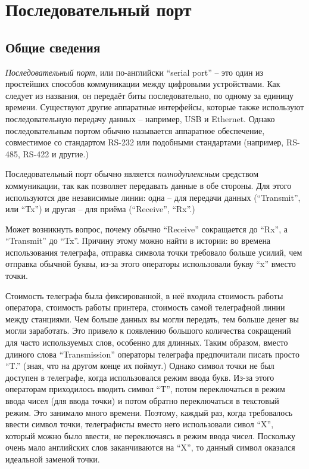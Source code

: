 \documentclass[../sparc.tex]{subfiles}
\begin{document}
\section{Последовательный порт}
\label{section:communication-serial-port}

\subsection{Общие сведения}

\emph{Последовательный порт}, или по-английски ``serial port'' -- это один из
простейших способов коммуникации между цифровыми устройствами.  Как следует из
названия, он передаёт биты последовательно, по одному за единицу времени.
Существуют другие аппаратные интерфейсы, которые также используют
последовательную передачу данных -- например, USB и Ethernet.  Однако
последовательным портом обычно называется аппаратное обеспечение, совместимое со
стандартом RS-232 или подобными стандартами (например, RS-485, RS-422 и другие.)

Последовательный порт обычно является \emph{полнодуплексным} средством
коммуникации, так как позволяет передавать данные в обе стороны.  Для этого
используются две независимые линии: одна -- для передачи данных (``Transmit'',
или ``Tx'') и другая -- для приёма (``Receive'', ``Rx''.)

Может возникнуть вопрос, почему обычно ``Receive'' сокращается до ``Rx'',
а ``Transmit'' до ``Tx''.  Причину этому можно найти в истории: во времена
использования телеграфа, отправка символа точки требовало больше усилий, чем
отправка обычной буквы, из-за этого операторы использовали букву ``x'' вместо
точки.

Стоимость телеграфа была фиксированной, в неё входила стоимость работы
оператора, стоимость работы принтера, стоимость самой телеграфной линии между
станциями.  Чем больше данных вы могли передать, тем больше денег вы могли
заработать.  Это привело к появлению большого количества сокращений для часто
используемых слов, особенно для длинных.  Таким образом, вместо длиного слова
``Transmission'' операторы телеграфа предпочитали писать просто ``T.'' (зная,
что на другом конце их поймут.)  Однако символ точки не был доступен в
телеграфе, когда использовался режим ввода букв.  Из-за этого операторам
приходилось вводить символ ``T'', потом переключаться в режим ввода чисел (для
ввода точки) и потом обратно переключаться в текстовый режим.  Это занимало
много времени.  Поэтому, каждый раз, когда требовалось ввести символ точки,
телеграфисты вместо него использовали сивол ``X'', который можно было ввести,
не переключаясь в режим ввода чисел.  Поскольку очень мало английских слов
заканчиваются на ``X'', то данный символ оказался идеальной заменой точки.
\end{document}
